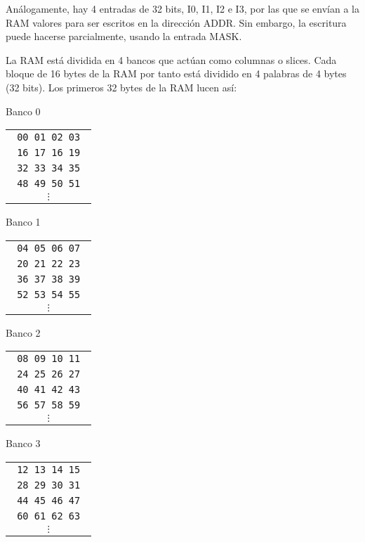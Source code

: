 \documentclass[letterpaper,11pt]{scrartcl}
\begin{document}
  Análogamente, hay 4 entradas de 32 bits, I0, I1, I2 e I3, por las que se envían
  a la RAM valores para ser escritos en la dirección ADDR. Sin embargo, la
  escritura puede hacerse parcialmente, usando la entrada MASK.
  
  La RAM está dividida en 4 bancos que actúan como columnas o slices.  Cada
  bloque de 16 bytes de la RAM por tanto está dividido en 4 palabras de 4 bytes
  (32 bits). Los primeros 32 bytes de la RAM lucen así:
  \vspace{-0.5em}
  \begin{center}
  \begin{minipage}[c]{5.5in}
   \begin{multicols}{5}
    \centering
    Banco 0

    \begin{tabular}{|c|}
     \hline
     \verb| 00 01 02 03 | \\
     \verb| 16 17 16 19 | \\
     \verb| 32 33 34 35 | \\
     \verb| 48 49 50 51 | \\
     $\vdots$
    \end{tabular}
    \columnbreak

    Banco 1

    \begin{tabular}{|c|}
     \hline
     \verb| 04 05 06 07 | \\
     \verb| 20 21 22 23 | \\
     \verb| 36 37 38 39 | \\
     \verb| 52 53 54 55 | \\
     $\vdots$
    \end{tabular}
   \columnbreak

    Banco 2

    \begin{tabular}{|c|}
     \hline
     \verb| 08 09 10 11 | \\
     \verb| 24 25 26 27 | \\
     \verb| 40 41 42 43 | \\
     \verb| 56 57 58 59 | \\
     $\vdots$
    \end{tabular}
    \columnbreak

    Banco 3

    \begin{tabular}{|c|}
     \hline
     \verb| 12 13 14 15 | \\
     \verb| 28 29 30 31 | \\
     \verb| 44 45 46 47 | \\
     \verb| 60 61 62 63 | \\
     $\vdots$
    \end{tabular}
    \columnbreak


\end{multicols}
\end{minipage}
\end{center}
\end{document}
